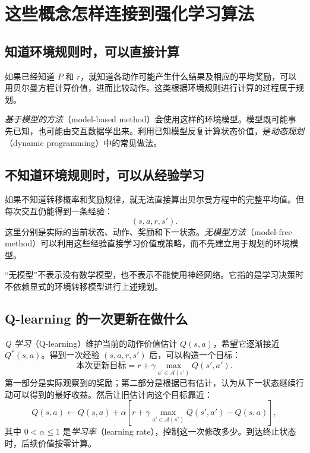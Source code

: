 \documentclass[UTF8,12pt,a4paper,fontset=fandol]{ctexart}
\begin{document}
\section{这些概念怎样连接到强化学习算法}
\label{sec:mdp-algorithms}

\subsection{知道环境规则时，可以直接计算}

如果已经知道 $P$ 和 $r$，就知道各动作可能产生什么结果及相应的平均奖励，可以用贝尔曼方程计算价值，进而比较动作。这类根据环境规则进行计算的过程属于规划。

\emph{基于模型的方法}（model-based method）会使用这样的环境模型。模型既可能事先已知，也可能由交互数据学出来。利用已知模型反复计算状态价值，是\emph{动态规划}（dynamic programming）中的常见做法。

\subsection{不知道环境规则时，可以从经验学习}

如果不知道转移概率和奖励规律，就无法直接算出贝尔曼方程中的完整平均值。但每次交互仍能得到一条经验：
\[
  (s,a,r,s').
\]
这里分别是实际的当前状态、动作、奖励和下一状态。\emph{无模型方法}（model-free method）可以利用这些经验直接学习价值或策略，而不先建立用于规划的环境模型。

“无模型”不表示没有数学模型，也不表示不能使用神经网络。它指的是学习决策时不依赖显式的环境转移模型进行上述规划。

\subsection{Q-learning 的一次更新在做什么}

\emph{Q 学习}（Q-learning）维护当前的动作价值估计 $Q(s,a)$，希望它逐渐接近 $Q^*(s,a)$。得到一次经验 $(s,a,r,s')$ 后，可以构造一个目标：
\[
  \text{本次更新目标}=r+\gamma\max_{a'\in\mathcal A(s')}Q(s',a').
\]
第一部分是实际观察到的奖励；第二部分是根据已有估计，认为从下一状态继续行动可以得到的最好收益。然后让旧估计向这个目标靠近：
\begin{equation}
  Q(s,a)\leftarrow Q(s,a)+\alpha
  \left[r+\gamma\max_{a'\in\mathcal A(s')}Q(s',a')-Q(s,a)\right],
  \label{eq:mdp-q-learning}
\end{equation}
其中 $0<\alpha\leq1$ 是\emph{学习率}（learning rate），控制这一次修改多少。到达终止状态时，后续价值按零计算。
\end{document}
